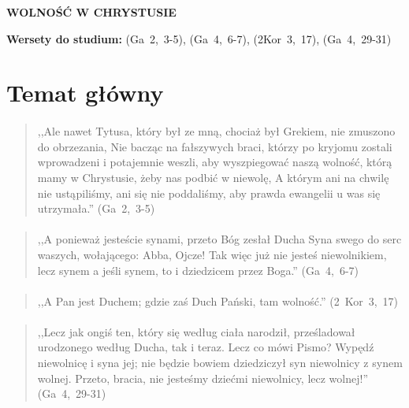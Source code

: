 \documentclass[10pt,a4paper,oneside]{article}
\begin{document}
\centerline{\textbf{\MakeUppercase{Wolność w Chrystusie}}}
\begin{center}
\textbf{Wersety do studium:} \mbox{(Ga 2, 3-5)}, \mbox{(Ga 4, 6-7)}, \mbox{(2Kor 3, 17)}, \mbox{(Ga 4, 29-31)}
\end{center}
\section{Temat główny}
\paragraph{}
\begin{quote}
,,Ale nawet Tytusa, który był ze mną, chociaż był Grekiem, nie zmuszono do obrzezania, Nie bacząc na fałszywych braci, którzy po kryjomu zostali wprowadzeni i potajemnie weszli, aby wyszpiegować naszą wolność, którą mamy w Chrystusie, żeby nas podbić w niewolę, A którym ani na chwilę nie ustąpiliśmy, ani się nie poddaliśmy, aby prawda ewangelii u was się utrzymała.'' \mbox{(Ga 2, 3-5)}
\end{quote}
\paragraph{}
\begin{quote}
,,A ponieważ jesteście synami, przeto Bóg zesłał Ducha Syna swego do serc waszych, wołającego: Abba, Ojcze! Tak więc już nie jesteś niewolnikiem, lecz synem a jeśli synem, to i dziedzicem przez Boga.'' \mbox{(Ga 4, 6-7)}
\end{quote}
\paragraph{}
\begin{quote}
,,A Pan jest Duchem; gdzie zaś Duch Pański, tam wolność.'' \mbox{(2 Kor 3, 17)}
\end{quote}
\paragraph{}
\begin{quote}
,,Lecz jak ongiś ten, który się według ciała narodził, prześladował urodzonego według Ducha, tak i teraz. Lecz co mówi Pismo? Wypędź niewolnicę i syna jej; nie będzie bowiem dziedziczył syn niewolnicy z synem wolnej. Przeto, bracia, nie jesteśmy dziećmi niewolnicy, lecz wolnej!'' \mbox{(Ga 4, 29-31)}
\end{quote}
\end{document}
